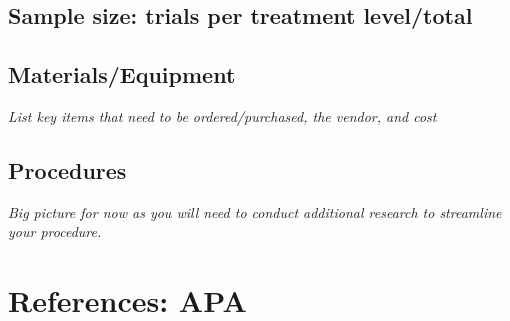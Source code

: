 \subsection{Sample size: trials per treatment level/total}

\begin{field}
  
\end{field}

\subsection{Materials/Equipment}

\emph{List key items that need to be ordered/purchased, the vendor, and
cost}

\begin{field}
 
\end{field}

\subsection{Procedures}

\emph{Big picture for now as you will need to conduct additional
research to streamline your procedure.}

\begin{field}
  
\end{field}


\section{References: APA}

\begin{field}

\end{field}

